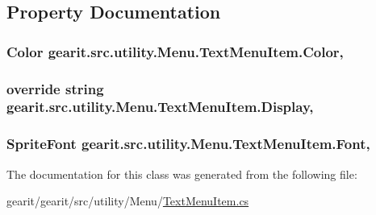 \subsection{Property Documentation}
\hypertarget{classgearit_1_1src_1_1utility_1_1_menu_1_1_text_menu_item_acecb216bb3768748d16cafc181a8b459}{
\subsubsection[{Color}]{\setlength{\rightskip}{0pt plus 5cm}Color gearit.\+src.\+utility.\+Menu.\+Text\+Menu\+Item.\+Color\hspace{0.3cm}{\ttfamily [get]}, {\ttfamily [set]}}}\label{classgearit_1_1src_1_1utility_1_1_menu_1_1_text_menu_item_acecb216bb3768748d16cafc181a8b459}
\hypertarget{classgearit_1_1src_1_1utility_1_1_menu_1_1_text_menu_item_a64b7bfba86e8afcd9efcc91f579aa07e}{
\subsubsection[{Display}]{\setlength{\rightskip}{0pt plus 5cm}override string gearit.\+src.\+utility.\+Menu.\+Text\+Menu\+Item.\+Display\hspace{0.3cm}{\ttfamily [get]}, {\ttfamily [set]}}}\label{classgearit_1_1src_1_1utility_1_1_menu_1_1_text_menu_item_a64b7bfba86e8afcd9efcc91f579aa07e}
\hypertarget{classgearit_1_1src_1_1utility_1_1_menu_1_1_text_menu_item_a2d37ec61a361d7c19864ab284c0f8bd4}{
\subsubsection[{Font}]{\setlength{\rightskip}{0pt plus 5cm}Sprite\+Font gearit.\+src.\+utility.\+Menu.\+Text\+Menu\+Item.\+Font\hspace{0.3cm}{\ttfamily [get]}, {\ttfamily [set]}}}\label{classgearit_1_1src_1_1utility_1_1_menu_1_1_text_menu_item_a2d37ec61a361d7c19864ab284c0f8bd4}


The documentation for this class was generated from the following file\+:\begin{DoxyCompactItemize}
\item 
gearit/gearit/src/utility/\+Menu/\hyperlink{_text_menu_item_8cs}{Text\+Menu\+Item.\+cs}\end{DoxyCompactItemize}
